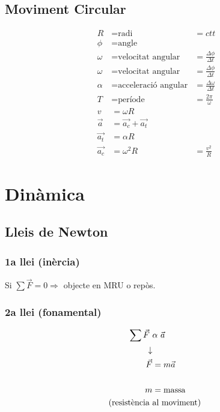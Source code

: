 \subsection{Moviment Circular}
\begin{align*}
    R &= \text{radi} &= ctt \\
    \phi &= \text{angle} \\
    \omega &= \text{velocitat angular} &= \frac{\Delta \phi}{\Delta t} \\
    \omega &= \text{velocitat angular} &= \frac{\Delta \phi}{\Delta t} \\
    \alpha &= \text{acceleració angular} &= \frac{\Delta \omega}{\Delta t} \\
    T &= \text{període} &= \frac{2\pi}{\omega} \\
    v &= \omega  R \\
    \vec{a} &= \vec{a_c} + \vec{a_t} \\
    \vec{a_t} &= \alpha  R \\
    \vec{a_c} &= \omega^2R &= \frac{v^2}{R}
\end{align*}

\section{Dinàmica}
\label{sec:dinamica}

\subsection{Lleis de Newton}
\subsubsection{1a llei (inèrcia)}
\begin{center}
    Si $\sum \vec{F} = 0 \Rightarrow$ objecte en MRU o repòs.
\end{center}

\subsubsection{2a llei (fonamental)}
\begin{align}
    \sum \vec{F}\ &\alpha\ \vec{a} \notag \\
    \downarrow & \notag \\
    \vec{F} &= m  \vec{a} \\ 
    \notag \\
    m &= \text{massa} \notag \\
    \text{(resistència }&\text{al moviment) }\notag
\end{align}

